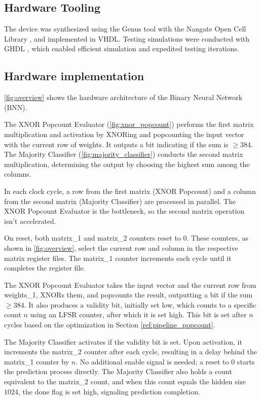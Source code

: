 \documentclass[conference]{IEEEtran}
\begin{document}
\subsection{Hardware Tooling}

The device was synthesized using the Genus tool \cite{genus} with the Nangate Open Cell Library \cite{nangate_lib}, and implemented in VHDL. Testing simulations were conducted with GHDL \cite{ghdl}, which enabled efficient simulation and expedited testing iterations.


\subsection{Hardware implementation}
\autoref{fig:overview} shows the hardware architecture of the Binary Neural Network (BNN). 

The XNOR Popcount Evaluator (\autoref{fig:xnor_popcount}) performs the first matrix multiplication and activation by XNORing and popcounting the input vector with the current row of weights. It outputs a bit indicating if the sum is $\geq 384$. The Majority Classifier (\autoref{fig:majority_classifier}) conducts the second matrix multiplication, determining the output by choosing the highest sum among the columns.

In each clock cycle, a row from the first matrix (XNOR Popcount) and a column from the second matrix (Majority Classifier) are processed in parallel. The XNOR Popcount Evaluator is the bottleneck, so the second matrix operation isn't accelerated. 

On reset, both matrix\_1 and matrix\_2 counters reset to 0. These counters, as shown in \autoref{fig:overview}, select the current row and column in the respective matrix register files. The matrix\_1 counter increments each cycle until it completes the register file. 

The XNOR Popcount Evaluator takes the input vector and the current row from weights\_1, XNORs them, and popcounts the result, outputting a bit if the sum $\geq 384$. It also produces a validity bit, initially set low, which counts to a specific count $n$ using an LFSR counter, after which it is set high. This bit is set after $n$ cycles based on the optimization in Section \ref{ref:pipeline_popcount}.

The Majority Classifier activates if the validity bit is set. Upon activation, it increments the matrix\_2 counter after each cycle, resulting in a delay behind the matrix\_1 counter by $n$. No additional enable signal is needed; a reset to 0 starts the prediction process directly. The Majority Classifier also holds a count equivalent to the matrix\_2 count, and when this count equals the hidden size $1024$, the done flag is set high, signaling prediction completion.
\end{document}
